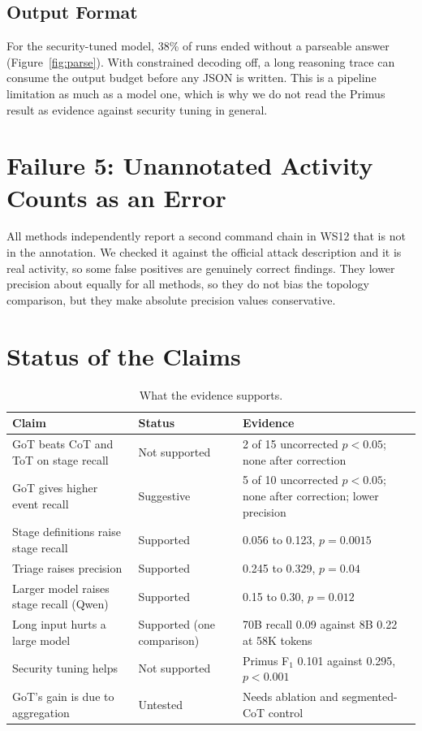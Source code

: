 \subsection{Output Format}
For the security-tuned model, 38\% of runs ended without a parseable answer (Figure~\ref{fig:parse}). With constrained decoding off, a long reasoning trace can consume the output budget before any JSON is written. This is a pipeline limitation as much as a model one, which is why we do not read the Primus result as evidence against security tuning in general.

\section{Failure 5: Unannotated Activity Counts as an Error}
All methods independently report a second command chain in WS12 that is not in the annotation. We checked it against the official attack description and it is real activity, so some false positives are genuinely correct findings. They lower precision about equally for all methods, so they do not bias the topology comparison, but they make absolute precision values conservative.

\section{Status of the Claims}
\begin{table}[H]
\centering
\caption{What the evidence supports.}
\label{tab:claims}
\small
\begin{tabularx}{\textwidth}{@{}>{\raggedright\arraybackslash}p{5.3cm} >{\raggedright\arraybackslash}p{2.9cm} Y@{}}
\toprule
\textbf{Claim} & \textbf{Status} & \textbf{Evidence} \\
\midrule
GoT beats CoT and ToT on stage recall & Not supported & 2 of 15 uncorrected $p<0.05$; none after correction \\
GoT gives higher event recall & Suggestive & 5 of 10 uncorrected $p<0.05$; none after correction; lower precision \\
Stage definitions raise stage recall & Supported & 0.056 to 0.123, $p=0.0015$ \\
Triage raises precision & Supported & 0.245 to 0.329, $p=0.04$ \\
Larger model raises stage recall (Qwen) & Supported & 0.15 to 0.30, $p=0.012$ \\
Long input hurts a large model & Supported (one comparison) & 70B recall 0.09 against 8B 0.22 at 58K tokens \\
Security tuning helps & Not supported & Primus F$_1$ 0.101 against 0.295, $p<0.001$ \\
GoT's gain is due to aggregation & Untested & Needs ablation and segmented-CoT control \\
\bottomrule
\end{tabularx}
\end{table}

